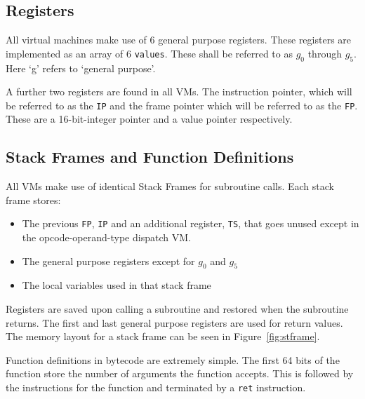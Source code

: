 \documentclass[english,a4paper]{article}
\begin{document}
\subsection{Registers}

All virtual machines make use of 6 general purpose registers. These
registers are implemented as an array of 6 \verb|values|. These shall
be referred to as $g_0$ through $g_5$. Here `g' refers to `general
purpose'.

A further two registers are found in all VMs. The instruction pointer,
which will be referred to as the \verb|IP| and the frame pointer which
will be referred to as the \verb|FP|. These are a 16-bit-integer
pointer and a value pointer respectively.

\subsection{Stack Frames and Function Definitions}

All VMs make use of identical Stack Frames for subroutine calls. Each
stack frame stores:

\begin{itemize}
\item The previous \verb|FP|, \verb|IP| and an additional register,
  \verb|TS|, that goes unused except in the opcode-operand-type
  dispatch VM.
\item The general purpose registers except for $g_0$ and $g_5$
\item The local variables used in that stack frame
\end{itemize}

Registers are saved upon calling a subroutine and restored when the
subroutine returns. The first and last general purpose registers are
used for return values. The memory layout for a stack frame can be
seen in Figure~\ref{fig:stframe}.

Function definitions in bytecode are extremely simple. The first 64
bits of the function store the number of arguments the function
accepts. This is followed by the instructions for the function and
terminated by a \verb|ret| instruction.
\end{document}
